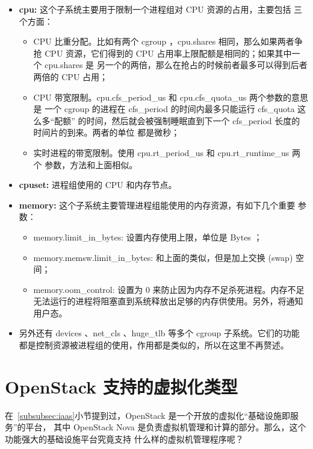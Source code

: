 \begin{itemize}
    \item \textbf{cpu:} 这个子系统主要用于限制一个进程组对 CPU 资源的占用，主要包括
    三个方面：
    \begin{itemize}
        \item CPU 比重分配。比如有两个 cgroup ，cpu.shares 相同，那么如果两者争抢
        CPU 资源，它们得到的 CPU 占用率上限配额是相同的；如果其中一个 cpu.shares 是
        另一个的两倍，那么在抢占的时候前者最多可以得到后者两倍的 CPU 占用；
        \item CPU 带宽限制。cpu.cfs_period_us 和 cpu.cfs_quota_us 两个参数的意思是
        一个 cgroup 的进程在 cfs_period 的时间内最多只能运行 cfs_quota 这么多“配额”
        的时间，然后就会被强制睡眠直到下一个 cfs_period 长度的时间片的到来。两者的单位
        都是微秒；
        \item 实时进程的带宽限制。使用 cpu.rt_period_us 和 cpu.rt_runtime_us 两个
        参数，方法和上面相似。
    \end{itemize}
    \item \textbf{cpuset:} 进程组使用的 CPU 和内存节点。
    \item \textbf{memory:} 这个子系统主要管理进程组能使用的内存资源，有如下几个重要
    参数：
    \begin{itemize}
        \item memory.limit_in_bytes: 设置内存使用上限，单位是 Bytes ；
        \item memory.memsw.limit_in_bytes: 和上面的类似，但是加上交换 (swap) 空间；
        \item memory.oom_control: 设置为 0 来防止因为内存不足杀死进程。内存不足
        无法运行的进程将阻塞直到系统释放出足够的内存供使用。另外，将通知用户态。
    \end{itemize}
    \item 另外还有 devices 、net_cls 、huge_tlb 等多个 cgroup 子系统。它们的功能
    都是控制资源被进程组的使用，作用都是类似的，所以在这里不再赘述。
\end{itemize}

\section{OpenStack 支持的虚拟化类型}

在~\ref{subsubsec:iaas}小节提到过，OpenStack 是一个开放的虚拟化“基础设施即服务”的平台，
其中 OpenStack Nova 是负责虚拟机管理和计算的部分。那么，这个功能强大的基础设施平台究竟支持
什么样的虚拟机管理程序呢？

